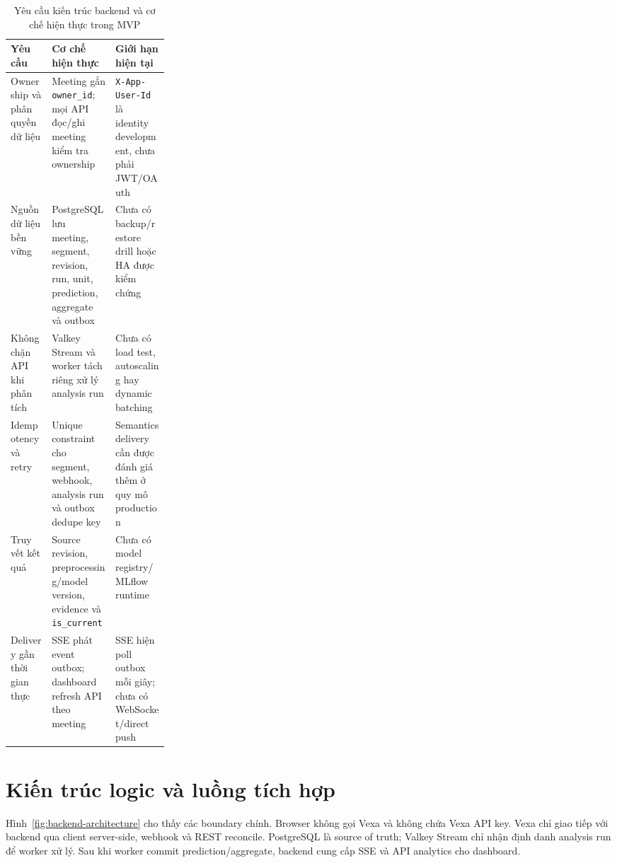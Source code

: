 \begin{table}[H]
\centering
\caption{Yêu cầu kiến trúc backend và cơ chế hiện thực trong MVP}
\label{tab:backend-design}
\begin{tabularx}{\linewidth}{p{0.26\linewidth}XX}
\toprule
Yêu cầu & Cơ chế hiện thực & Giới hạn hiện tại \\ \midrule
Ownership và phân quyền dữ liệu & Meeting gắn \texttt{owner\_id}; mọi API đọc/ghi meeting kiểm tra ownership & \texttt{X-App-User-Id} là identity development, chưa phải JWT/OAuth \\
Nguồn dữ liệu bền vững & PostgreSQL lưu meeting, segment, revision, run, unit, prediction, aggregate và outbox & Chưa có backup/restore drill hoặc HA được kiểm chứng \\
Không chặn API khi phân tích & Valkey Stream và worker tách riêng xử lý analysis run & Chưa có load test, autoscaling hay dynamic batching \\
Idempotency và retry & Unique constraint cho segment, webhook, analysis run và outbox dedupe key & Semantics delivery cần được đánh giá thêm ở quy mô production \\
Truy vết kết quả & Source revision, preprocessing/model version, evidence và \texttt{is\_current} & Chưa có model registry/MLflow runtime \\
Delivery gần thời gian thực & SSE phát event outbox; dashboard refresh API theo meeting & SSE hiện poll outbox mỗi giây; chưa có WebSocket/direct push \\
\bottomrule
\end{tabularx}
\end{table}

\section{Kiến trúc logic và luồng tích hợp}
Hình~\ref{fig:backend-architecture} cho thấy các boundary chính. Browser không gọi Vexa và không chứa Vexa API key. Vexa chỉ giao tiếp với backend qua client server-side, webhook và REST reconcile. PostgreSQL là source of truth; Valkey Stream chỉ nhận định danh analysis run để worker xử lý. Sau khi worker commit prediction/aggregate, backend cung cấp SSE và API analytics cho dashboard.


